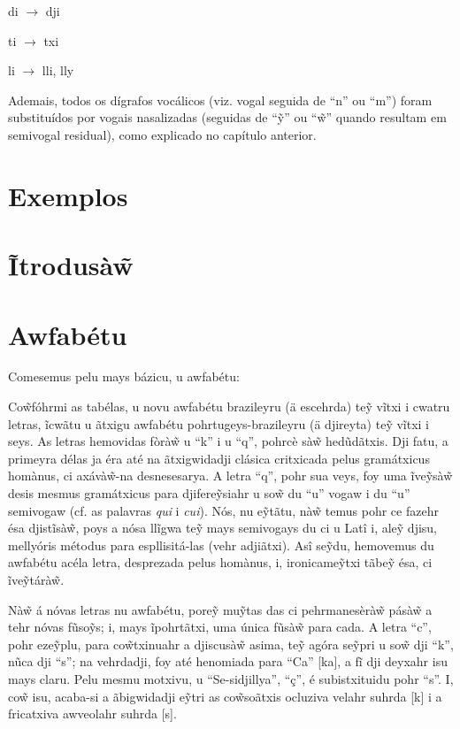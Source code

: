 \documentclass[12pt, a5paper, titlepage]{article}
\begin{document}
\begin{bilingualpages}
    di $\rightarrow$ dji

    ti $\rightarrow$ txi

    li $\rightarrow$ lli, lly

    Ademais, todos os dígrafos vocálicos (viz. vogal seguida de ``n'' ou ``m'')
    foram substituídos por vogais nasalizadas (seguidas de ``\~y'' ou ``\~w''
    quando resultam em semivogal residual), como explicado no capítulo anterior.

    \section{Exemplos}

    \leftpage
    \section{Ĩtrodusà\~w}

    \newpage
    \section{Awfabétu}
    Comesemus pelu mays bázicu, u awfabétu: \BrTableAbc

    Co\~wfóhrmi as tabélas, u novu awfabétu brazileyru (ä escehrda) te\~y vĩtxi i
    cwatru letras, ĩcwãtu u ãtxigu awfabétu pohrtugeys-brazileyru (ä djireyta)
    te\~y vĩtxi i seys. As letras hemovidas fòrà\~w u ``k'' i u ``q'', pohrcè sà\~w
    hedũdãtxis. Dji fatu, a primeyra délas ja éra até na ãtxigwidadji clásica
    critxicada pelus gramátxicus homànus, ci axávà\~w-na desnesesarya. A letra
    ``q'', pohr sua veys, foy uma ĩve\~ysà\~w desis mesmus gramátxicus para
    djifere\~ysiahr u so\~w du ``u'' vogaw i du ``u'' semivogaw (cf. as palavras
    \textit{qui} i \textit{cui}). Nós, nu e\~ytãtu, nà\~w temus pohr ce fazehr ésa
    djistĩsà\~w, poys a nósa llĩgwa te\~y mays semivogays du ci u Latî i, ale\~y
    djisu, mellyóris métodus para espllisitá-las (vehr adjiãtxi). Asî se\~ydu,
    hemovemus du awfabétu acéla letra, desprezada pelus homànus, i, ironicame\~ytxi
    tãbe\~y ésa, ci ĩve\~ytárà\~w.

    Nà\~w á nóvas letras nu awfabétu, pore\~y mu\~ytas das ci pehrmanesèrà\~w
    pásà\~w a tehr nóvas fũso\~ys; i, mays ĩpohrtãtxi, uma única fũsà\~w para cada.
    A letra ``c'', pohr eze\~yplu, para co\~wtxinuahr a djiscusà\~w asima, te\~y
    agóra se\~ypri u so\~w dji ``k'', nũca dji ``s''; na vehrdadji, foy até
    henomiada para ``Ca'' [ka], a fĩ dji deyxahr isu mays claru. Pelu mesmu
    motxivu, u ``Se-sidjillya'', ``ç'', é subistxituidu pohr ``s''. I, co\~w isu,
    acaba-si a ãbigwidadji e\~ytri as co\~wsoãtxis ocluziva velahr suhrda [k] i a
    fricatxiva awveolahr suhrda [s].


\end{bilingualpages}
\end{document}
